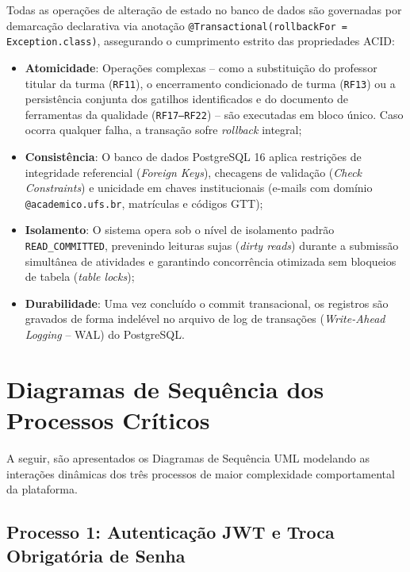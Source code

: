 Todas as operações de alteração de estado no banco de dados são governadas por demarcação declarativa via anotação \texttt{@Transactional(rollbackFor = Exception.class)}, assegurando o cumprimento estrito das propriedades ACID:

\begin{itemize}
    \item \textbf{Atomicidade}: Operações complexas -- como a substituição do professor titular da turma (\texttt{RF11}), o encerramento condicionado de turma (\texttt{RF13}) ou a persistência conjunta dos gatilhos identificados e do documento de ferramentas da qualidade (\texttt{RF17--RF22}) -- são executadas em bloco único. Caso ocorra qualquer falha, a transação sofre \textit{rollback} integral;
    \item \textbf{Consistência}: O banco de dados PostgreSQL 16 aplica restrições de integridade referencial (\textit{Foreign Keys}), checagens de validação (\textit{Check Constraints}) e unicidade em chaves institucionais (e-mails com domínio \texttt{@academico.ufs.br}, matrículas e códigos GTT);
    \item \textbf{Isolamento}: O sistema opera sob o nível de isolamento padrão \texttt{READ\_COMMITTED}, prevenindo leituras sujas (\textit{dirty reads}) durante a submissão simultânea de atividades e garantindo concorrência otimizada sem bloqueios de tabela (\textit{table locks});
    \item \textbf{Durabilidade}: Uma vez concluído o commit transacional, os registros são gravados de forma indelével no arquivo de log de transações (\textit{Write-Ahead Logging} -- WAL) do PostgreSQL.
\end{itemize}

\section{Diagramas de Sequência dos Processos Críticos}
\label{sec_diagramas_sequencia}

A seguir, são apresentados os Diagramas de Sequência UML modelando as interações dinâmicas dos três processos de maior complexidade comportamental da plataforma.

\subsection{Processo 1: Autenticação JWT e Troca Obrigatória de Senha}
\label{subsec_seq_auth}

